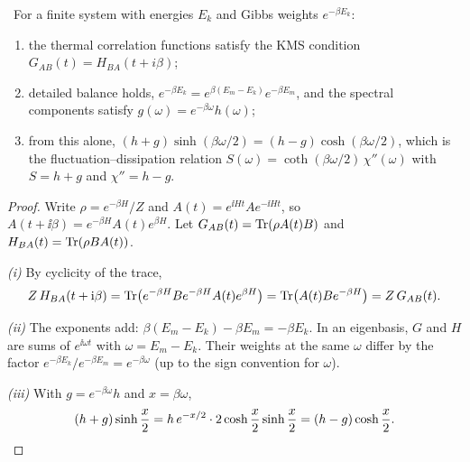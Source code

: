 \begin{theorem}\label{thm:kms}\ver\
For a finite system with energies $E_k$ and Gibbs weights $e^{-\beta E_k}$:
\begin{enumerate}[label=(\roman*)]
\item the thermal correlation functions satisfy the KMS condition $G_{AB}(t)=H_{BA}(t+i\beta)$;
\item detailed balance holds, $e^{-\beta E_k}=e^{\beta(E_m-E_k)}e^{-\beta E_m}$, and the spectral components satisfy $g(\omega)=e^{-\beta\omega}h(\omega)$;
\item from this alone, $(h+g)\sinh(\beta\omega/2)=(h-g)\cosh(\beta\omega/2)$, which is the fluctuation--dissipation relation $S(\omega)=\coth(\beta\omega/2)\,\chi''(\omega)$ with $S=h+g$ and $\chi''=h-g$.
\end{enumerate}
\end{theorem}
\begin{proof}
Write $\rho=e^{-\beta H}/Z$ and $A(t)=e^{\ii Ht}Ae^{-\ii Ht}$, so $A(t+\ii\beta)=e^{-\beta H}A(t)e^{\beta H}$. Let $G_{AB}(t)=\operatorname{Tr}(\rho A(t)B)$ and $H_{BA}(t)=\operatorname{Tr}(\rho BA(t))$.

\emph{(i)} By cyclicity of the trace,
\[
Z\,H_{BA}(t+\mathrm{i}\beta)=\operatorname{Tr}\bigl(e^{-\beta H}Be^{-\beta H}A(t)e^{\beta H}\bigr)=\operatorname{Tr}\bigl(A(t)Be^{-\beta H}\bigr)=Z\,G_{AB}(t).
\]

\emph{(ii)} The exponents add: $\beta(E_m-E_k)-\beta E_m=-\beta E_k$. In an eigenbasis, $G$ and $H$ are sums of $e^{\ii\omega t}$ with $\omega=E_m-E_k$. Their weights at the same $\omega$ differ by the factor $e^{-\beta E_k}/e^{-\beta E_m}=e^{-\beta\omega}$ (up to the sign convention for $\omega$).

\emph{(iii)} With $g=e^{-\beta\omega}h$ and $x=\beta\omega$,
\[
(h+g)\sinh\frac x2=h\,e^{-x/2}\cdot2\cosh\frac x2\sinh\frac x2=(h-g)\cosh\frac x2 .\qedhere
\]
\end{proof}


